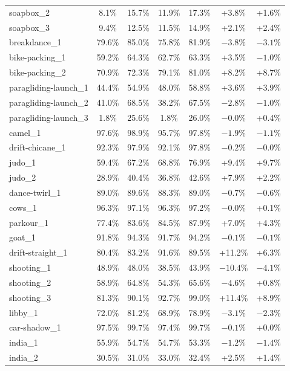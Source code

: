 \documentclass[journal,12pt,onecolumn,draftclsnofoot]{IEEEtran}
\begin{document}
\begin{longtable}{l c c c c c c}
soapbox\_2 & 8.1\% & 15.7\% & 11.9\% & 17.3\% & +3.8\% & +1.6\% \\
soapbox\_3 & 9.4\% & 12.5\% & 11.5\% & 14.9\% & +2.1\% & +2.4\% \\
breakdance\_1 & 79.6\% & 85.0\% & 75.8\% & 81.9\% & $-3.8\%$ & $-3.1\%$ \\
bike-packing\_1 & 59.2\% & 64.3\% & 62.7\% & 63.3\% & +3.5\% & $-1.0\%$ \\
bike-packing\_2 & 70.9\% & 72.3\% & 79.1\% & 81.0\% & +8.2\% & +8.7\% \\
paragliding-launch\_1 & 44.4\% & 54.9\% & 48.0\% & 58.8\% & +3.6\% & +3.9\% \\
paragliding-launch\_2 & 41.0\% & 68.5\% & 38.2\% & 67.5\% & $-2.8\%$ & $-1.0\%$ \\
paragliding-launch\_3 & 1.8\% & 25.6\% & 1.8\% & 26.0\% & $-0.0\%$ & +0.4\% \\
camel\_1 & 97.6\% & 98.9\% & 95.7\% & 97.8\% & $-1.9\%$ & $-1.1\%$ \\
drift-chicane\_1 & 92.3\% & 97.9\% & 92.1\% & 97.8\% & $-0.2\%$ & $-0.0\%$ \\
judo\_1 & 59.4\% & 67.2\% & 68.8\% & 76.9\% & +9.4\% & +9.7\% \\
judo\_2 & 28.9\% & 40.4\% & 36.8\% & 42.6\% & +7.9\% & +2.2\% \\
dance-twirl\_1 & 89.0\% & 89.6\% & 88.3\% & 89.0\% & $-0.7\%$ & $-0.6\%$ \\
cows\_1 & 96.3\% & 97.1\% & 96.3\% & 97.2\% & $-0.0\%$ & +0.1\% \\
parkour\_1 & 77.4\% & 83.6\% & 84.5\% & 87.9\% & +7.0\% & +4.3\% \\
goat\_1 & 91.8\% & 94.3\% & 91.7\% & 94.2\% & $-0.1\%$ & $-0.1\%$ \\
drift-straight\_1 & 80.4\% & 83.2\% & 91.6\% & 89.5\% & +11.2\% & +6.3\% \\
shooting\_1 & 48.9\% & 48.0\% & 38.5\% & 43.9\% & $-10.4\%$ & $-4.1\%$ \\
shooting\_2 & 58.9\% & 64.8\% & 54.3\% & 65.6\% & $-4.6\%$ & +0.8\% \\
shooting\_3 & 81.3\% & 90.1\% & 92.7\% & 99.0\% & +11.4\% & +8.9\% \\
libby\_1 & 72.0\% & 81.2\% & 68.9\% & 78.9\% & $-3.1\%$ & $-2.3\%$ \\
car-shadow\_1 & 97.5\% & 99.7\% & 97.4\% & 99.7\% & $-0.1\%$ & +0.0\% \\
india\_1 & 55.9\% & 54.7\% & 54.7\% & 53.3\% & $-1.2\%$ & $-1.4\%$ \\
india\_2 & 30.5\% & 31.0\% & 33.0\% & 32.4\% & +2.5\% & +1.4\% \\

\end{longtable}
\end{document}
